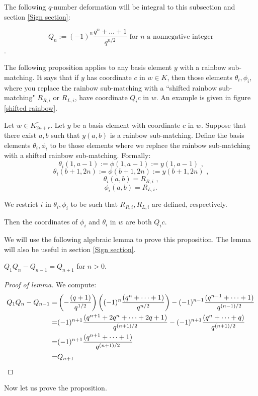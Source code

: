 \documentclass{amsart}
\begin{document}
\begin{definition}
	The following $q$-number deformation will be integral to this subsection and section \ref{Sign section}:
	
	$$Q_n:=(-1)^n\frac{q^n+\ldots+1}{q^{n/2}} \text{ for }n \text{ a nonnegative integer}$$. 
\end{definition}

The following proposition applies to any basis element $y$ with a rainbow sub-matching. It says that if $y$ has coordinate $c$ in $w\in K$, then those elements $\theta_i,\phi_i$, where you replace the rainbow sub-matching with a ``shifted rainbow sub-matching" $R_{R,i}$ or $R_{L,i}$, have coordinate $Q_ic$ in $w$. An example is given in figure \ref{shifted rainbow}.

\begin{proposition}
	Let $w\in K^r_{2n+r}$. Let $y$ be a basis element with coordinate $c$ in $w$. Suppose that there exist $a,b$ such that $y(a,b)$ is a rainbow sub-matching. Define the basis elements $\theta_i,\phi_i$ to be those elements where we replace the rainbow sub-matching with a shifted rainbow sub-matching. Formally: $$\theta_i(1,a-1):=\phi(1,a-1):=y(1,a-1)\text{ ,}$$
	$$\theta_i(b+1,2n):=\phi(b+1,2n):=y(b+1,2n)\text{ ,}$$ 
	$$\theta_i(a,b)=R_{R,i}\text{ ,}$$ $$\phi_i(a,b)=R_{L,i}\text{.}$$ 
	
	We restrict $i$ in $\theta_i,\phi_i$ to be such that $R_{R,i},R_{L,i}$ are defined, respectively.
	
	Then the coordinates of $\phi_i$ and $\theta_i$ in $w$ are both $Q_ic$.
	
	\label{shifted rainbow coeffs}
\end{proposition}

We will use the following algebraic lemma to prove this proposition. The lemma will also be useful in section \ref{Sign section}.

\begin{lemma}
	$Q_1Q_n-Q_{n-1}=Q_{n+1}$ for $n>0$.
	
	\label{Q alg}
\end{lemma}

\begin{proof}[Proof of lemma]
	We compute:
	\begin{align*}
		Q_1Q_n-Q_{n-1}=&\left( -\frac{(q+1)}{q^{1/2}} \right)\left( (-1)^n\frac{(q^n+\cdots+1)}{q^{n/2}} \right)-(-1)^{n-1}\frac{(q^{n-1}+\cdots+1)}{q^{(n-1)/2}}\\
		=&(-1)^{n+1}\frac{(q^{n+1}+2q^n+\cdots+2q+1)}{q^{(n+1)/2}}-(-1)^{n+1}\frac{(q^n+\cdots+q)}{q^{(n+1)/2}}\\
		=&(-1)^{n+1}\frac{(q^{n+1}+\cdots+1)}{q^{(n+1)/2}}\\
		=&Q_{n+1}
	\end{align*}
\end{proof}
Now let us prove the proposition.
\end{document}

